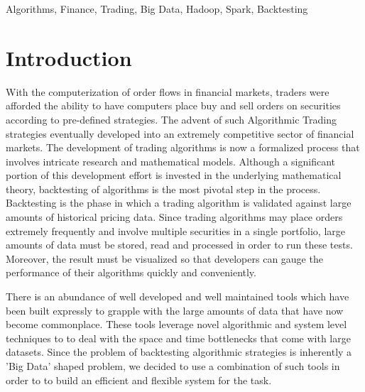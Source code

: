\documentclass[10pt, conference, compsocconf]{IEEEtran}
\begin{document}
\begin{IEEEkeywords}
Algorithms, Finance, Trading, Big Data, Hadoop, Spark, Backtesting

\end{IEEEkeywords}


%
\IEEEpeerreviewmaketitle



\section{Introduction}

With the computerization of order flows in financial markets, traders were afforded the ability to have computers place buy and sell orders on securities according to pre-defined strategies. The advent of such Algorithmic Trading strategies eventually developed into an extremely competitive sector of financial markets. The development of trading algorithms is now a formalized process that involves intricate research and mathematical models. Although a significant portion of this development effort is invested in the underlying mathematical theory, backtesting of algorithms is the most pivotal step in the process. Backtesting is the phase in which a trading algorithm is validated against large amounts of historical pricing data. Since trading algorithms may place orders extremely frequently and involve multiple securities in a single portfolio, large amounts of data must be stored, read and processed in order to run these tests. Moreover, the result must be visualized so that developers can gauge the performance of their algorithms quickly and conveniently.

There is an abundance of well developed and well maintained tools which have been built expressly to grapple with the large amounts of data that have now become commonplace. These tools leverage novel algorithmic and system level techniques to to deal with the space and time bottlenecks that come with large datasets. Since the problem of backtesting algorithmic strategies is inherently a 'Big Data' shaped problem, we decided to use a combination of such tools in order to to build an efficient and flexible system for the task. 
\end{document}
